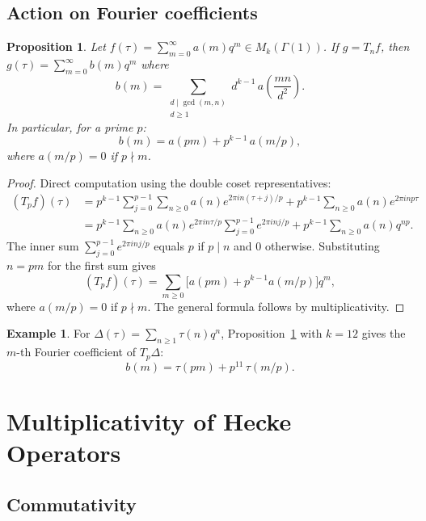 \documentclass[12pt,a4paper]{amsart}
\newtheorem{proposition}[theorem]{Proposition}
\theoremstyle{definition}
\newtheorem{example}[theorem]{Example}
\begin{document}
\subsection{Action on Fourier coefficients}

\begin{proposition}\label{prop:hecke-fourier}
  Let $f(\tau) = \sum_{m=0}^{\infty} a(m) q^m \in M_k(\Gamma(1))$.
  If $g = T_n f$, then $g(\tau) = \sum_{m=0}^{\infty} b(m) q^m$ where
  \[
    b(m) = \sum_{\substack{d \mid \gcd(m,n) \\ d \ge 1}} d^{k-1}\, a\!\left(\frac{mn}{d^2}\right).
  \]
  In particular, for a prime $p$:
  \[
    b(m) = a(pm) + p^{k-1}\,a(m/p),
  \]
  where $a(m/p) = 0$ if $p \nmid m$.
\end{proposition}

\begin{proof}
  Direct computation using the double coset representatives:
  \begin{align*}
    (T_p f)(\tau)
    &= p^{k-1}\sum_{j=0}^{p-1}\sum_{n \ge 0} a(n) e^{2\pi i n(\tau+j)/p}
       + p^{k-1} \sum_{n\ge 0}a(n) e^{2\pi i n p\tau} \\
    &= p^{k-1}\sum_{n \ge 0} a(n) e^{2\pi i n\tau/p}
       \sum_{j=0}^{p-1} e^{2\pi inj/p}
       + p^{k-1}\sum_{n \ge 0}a(n) q^{np}.
  \end{align*}
  The inner sum $\sum_{j=0}^{p-1} e^{2\pi i nj/p}$ equals $p$ if $p \mid n$
  and $0$ otherwise. Substituting $n = pm$ for the first sum gives
  \[
    (T_p f)(\tau) = \sum_{m \ge 0}\bigl[a(pm) + p^{k-1}a(m/p)\bigr]q^m,
  \]
  where $a(m/p) = 0$ if $p \nmid m$. The general formula follows by
  multiplicativity.
\end{proof}

\begin{example}\label{ex:delta}
  For $\Delta(\tau) = \sum_{n \ge 1}\tau(n)q^n$, Proposition~\ref{prop:hecke-fourier}
  with $k=12$ gives the $m$-th Fourier coefficient of $T_p\Delta$:
  \[
    b(m) = \tau(pm) + p^{11}\,\tau(m/p).
  \]
\end{example}


\section{Multiplicativity of Hecke Operators}

\subsection{Commutativity}
\end{document}
